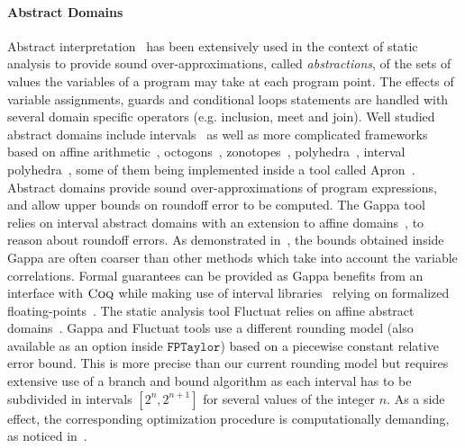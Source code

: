 \documentclass[preprint,fleqn,nocopyrightspace]{sigplanconf}
\newcommand{\coq}{\text{\sc Coq}}
\newcommand{\fptaylor}{\mathtt{FPTaylor}}
\theoremstyle{plain}
\begin{document}
\paragraph{Abstract Domains}
Abstract interpretation~\cite{CousotCousot77} has been extensively used in the context of static analysis to provide sound over-approximations, called {\em abstractions}, of the sets of values the variables of a program may take at each program point. The effects of variable assignments, guards and conditional loops statements are handled with several domain specific operators (e.g. inclusion, meet and join). Well studied abstract domains include intervals~\cite{Moore62} as well as more complicated frameworks based on affine arithmetic~\cite{Stolfi03}, octogons~\cite{octogons}, zonotopes~\cite{Zonotope10}, polyhedra~\cite{polyhedra08}, interval polyhedra~\cite{IntervalPoly09}, some of them being implemented inside a tool called {\sc Apron}~\cite{Apron09}. Abstract domains provide sound over-approximations of program expressions, and allow upper bounds on roundoff error to be computed. 
The {\sc Gappa} tool~\cite{Daumas10} relies on interval abstract domains with an extension to affine domains~\cite{Linderman10}, to reason about roundoff errors.
As demonstrated in~\cite{fptaylor15}, the bounds obtained inside {\sc Gappa} are often coarser than other methods which take into account the variable correlations. Formal guarantees can be provided as {\sc Gappa} benefits from an interface with $\coq$ while making use of interval libraries~\cite{Melquiond201214} relying on formalized floating-points~\cite{BM11Flocq}. The static analysis tool {\sc Fluctuat} relies on affine abstract domains~\cite{Blanchet03}. {\sc Gappa} and {\sc Fluctuat} tools use a different rounding model (also available as an option inside $\fptaylor$) based on a piecewise constant relative error bound. This is more precise than our current rounding model but requires extensive use of a branch and bound algorithm as each interval has to be subdivided in intervals $[2^n, 2^{n+1}]$ for several values of the integer $n$.  As a side effect, the corresponding optimization procedure is computationally demanding, as noticed in~\cite{fptaylor15}.
\end{document}
